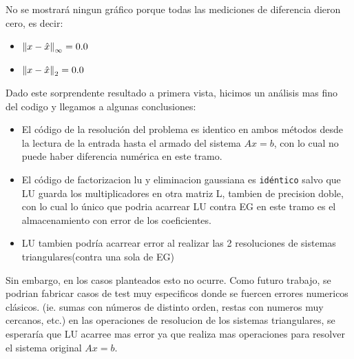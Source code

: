 No se mostrará ningun gráfico porque todas las mediciones de diferencia dieron cero, es decir:

\begin{itemize}
    \item $\left\lVert x - \hat{x} \right\rVert_\infty = 0.0 $
    \item $\left\lVert x - \hat{x} \right\rVert_2 = 0.0 $ 
\end{itemize}

Dado este sorprendente resultado a primera vista, hicimos un análisis mas fino del codigo y llegamos a algunas conclusiones:
\begin{itemize}
	\item El código de la resolución del problema es identico en ambos métodos desde la lectura de la entrada hasta el armado del sistema $Ax=b$, con lo cual no puede haber diferencia numérica en este tramo.
	\item El código de factorizacion lu y eliminacion gaussiana es \texttt{idéntico} salvo que LU guarda los multiplicadores en otra matriz L, tambien de precision doble, con lo cual lo único que podria acarrear LU contra EG en este tramo es el almacenamiento con error de los coeficientes.
	\item LU tambien podría acarrear error al realizar las 2 resoluciones de sistemas triangulares(contra una sola de EG)
\end{itemize}

Sin embargo, en los casos planteados esto no ocurre. Como futuro trabajo, se podrian fabricar casos de test muy especificos donde se fuercen errores numericos clásicos. (ie. sumas con números de distinto orden, restas con numeros muy cercanos, etc.) en las operaciones de resolucion de los sistemas triangulares, se esperaría que LU acarree mas error ya que realiza mas operaciones para resolver el sistema original $Ax=b$.


